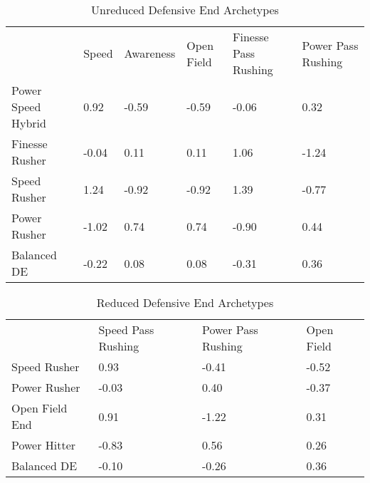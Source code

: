 \documentclass[11pt]{article}
\begin{document}
\begin{table}[]
\centering
\caption{Unreduced Defensive End Archetypes}
\label{UnreducedDefensiveEnd}
\begin{tabular}{llllll}
                   & Speed & Awareness & Open Field & Finesse Pass Rushing & Power Pass Rushing \\
Power Speed Hybrid & 0.92  & -0.59     & -0.59      & -0.06                & 0.32               \\
Finesse Rusher     & -0.04 & 0.11      & 0.11       & 1.06                 & -1.24              \\
Speed Rusher       & 1.24  & -0.92     & -0.92      & 1.39                 & -0.77              \\
Power Rusher       & -1.02 & 0.74      & 0.74       & -0.90                & 0.44               \\
Balanced DE        & -0.22 & 0.08      & 0.08       & -0.31                & 0.36              
\end{tabular}
\end{table}

\begin{table}[]
\centering
\caption{Reduced Defensive End Archetypes}
\label{ReducedDefensiveEnd}
\begin{tabular}{llll}
               & Speed Pass Rushing & Power Pass Rushing & Open Field \\
Speed Rusher   & 0.93               & -0.41              & -0.52      \\
Power Rusher   & -0.03              & 0.40               & -0.37      \\
Open Field End & 0.91               & -1.22              & 0.31       \\
Power Hitter   & -0.83              & 0.56               & 0.26       \\
Balanced DE    & -0.10              & -0.26              & 0.36      
\end{tabular}
\end{table}
\end{document}
